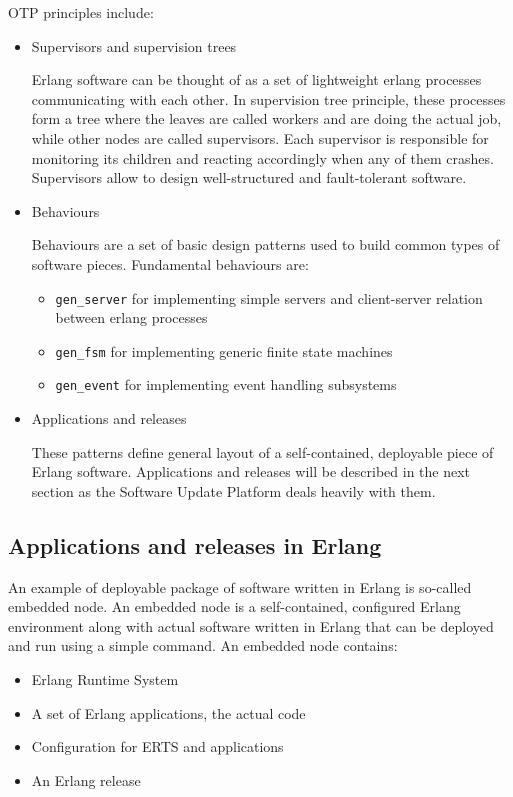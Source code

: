 OTP principles include:
\begin{itemize}
\item Supervisors and supervision trees

Erlang software can be thought of as a set of lightweight erlang processes communicating with
each other. In supervision tree principle, these processes form a tree where the leaves are
called workers and are doing the actual job, while other nodes are called supervisors.
Each supervisor is responsible for monitoring its children and reacting accordingly when
any of them crashes. Supervisors allow to design well-structured and fault-tolerant
software.

\item Behaviours

Behaviours are a set of basic design patterns used to build common types of software
pieces. Fundamental behaviours are:
\begin{itemize}
\item {\tt gen\_server} for implementing simple servers and client-server relation between erlang
processes
\item {\tt gen\_fsm} for implementing generic finite state machines
\item {\tt gen\_event} for implementing event handling subsystems
\end{itemize}
\item Applications and releases

These patterns define general layout of a self-contained, deployable piece of Erlang
software. Applications and releases will be described in the next section as the
Software Update Platform deals heavily with them.

\end{itemize}

\subsection{Applications and releases in Erlang}

An example of deployable package of software written in Erlang is so-called embedded
node. An embedded node is a self-contained, configured Erlang environment along with actual software
written in Erlang that can be deployed and run using a simple command. An embedded node contains:
\begin{itemize}
\item Erlang Runtime System
\item A set of Erlang applications, the actual code
\item Configuration for ERTS and applications
\item An Erlang release
\end{itemize}

